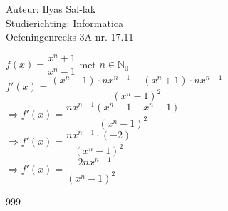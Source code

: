 \documentclass[a4paper]{article}
\begin{document}
\noindent \large Auteur: Ilyas Sal-lak \\
\noindent \large Studierichting: Informatica\\
\noindent \large Oefeningenreeks 3A nr. 17.11\\

\medskip

\normalsize

$f(x) = \dfrac{x^n + 1}{x^n - 1}$ met $n \in \mathbb{N}_0$ \\

$f'(x) = \dfrac{\left(x^n - 1\right) \cdot nx^{n-1} - \left(x^n + 1\right) \cdot nx^{n-1}}{\left(x^n - 1\right)^2}$ \\

$\Rightarrow f'(x) = \dfrac{nx^{n-1}\left(x^n - 1 - x^n - 1\right)}{\left(x^n - 1\right)^2}$ \\

$\Rightarrow f'(x) = \dfrac{nx^{n-1} \cdot (-2)}{\left(x^n - 1\right)^2}$ \\

$\Rightarrow f'(x) = \dfrac{-2nx^{n-1}}{\left(x^n - 1\right)^2}$

\begin{thebibliography}{999}
\end{thebibliography}
\end{document}
